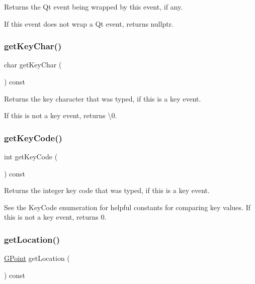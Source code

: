 Returns the Qt event being wrapped by this event, if any. 

If this event does not wrap a Qt event, returns nullptr. \mbox{\label{classGEvent_ab23396e09d92df320d2324b47a0766e8}} 
\subsubsection{\texorpdfstring{get\+Key\+Char()}{getKeyChar()}}
{\footnotesize\ttfamily char get\+Key\+Char (\begin{DoxyParamCaption}{ }\end{DoxyParamCaption}) const\hspace{0.3cm}{\ttfamily [virtual]}}



Returns the key character that was typed, if this is a key event. 

If this is not a key event, returns \textquotesingle{}\textbackslash{}0\textquotesingle{}. \mbox{\label{classGEvent_a71429f4b3c8f3c5097fe39e50501bbb6}} 
\subsubsection{\texorpdfstring{get\+Key\+Code()}{getKeyCode()}}
{\footnotesize\ttfamily int get\+Key\+Code (\begin{DoxyParamCaption}{ }\end{DoxyParamCaption}) const\hspace{0.3cm}{\ttfamily [virtual]}}



Returns the integer key code that was typed, if this is a key event. 

See the Key\+Code enumeration for helpful constants for comparing key values. If this is not a key event, returns 0. \mbox{\label{classGEvent_a4f83802015511edeb63b892830812c11}} 
\subsubsection{\texorpdfstring{get\+Location()}{getLocation()}}
{\footnotesize\ttfamily \mbox{\hyperlink{structGPoint}{G\+Point}} get\+Location (\begin{DoxyParamCaption}{ }\end{DoxyParamCaption}) const\hspace{0.3cm}{\ttfamily [virtual]}}



